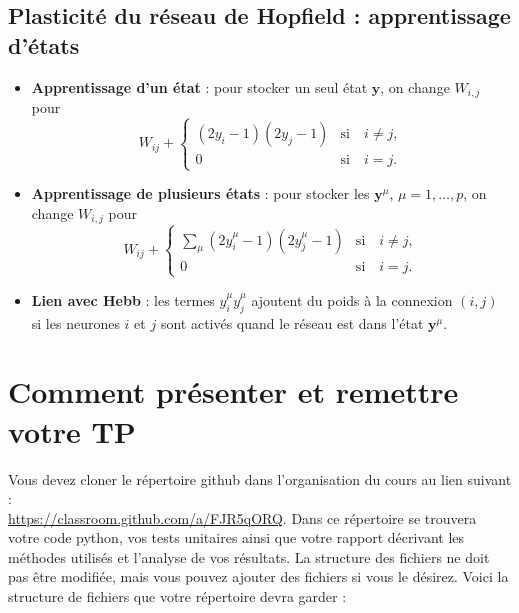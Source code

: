 \documentclass[12pt, letterpaper]{article}
\numberwithin{table}{section}
\numberwithin{figure}{section}
\numberwithin{equation}{section}
\begin{document}
\subsection{Plasticité du réseau de Hopfield : apprentissage d'états}
\begin{itemize}[label=\textbullet]
    \item \textbf{Apprentissage d'un état} : pour stocker un seul état $\mathbf{y}$, on change $W_{i,j}$ pour
    \[
    W_{ij} +
    \begin{cases}
    (2y_i - 1)(2y_j - 1)&  \text{si} \quad i \neq j, \\
    0 &  \text{si} \quad i= j.
    \end{cases}
    \]
    \item \textbf{Apprentissage de plusieurs états} : pour stocker les $\mathbf{y}^\mu$, $\mu=1,\ldots, p$,  on change $W_{i,j}$ pour
    \[
    W_{ij} +
    \begin{cases}
    \sum_{\mu}(2y^\mu_i - 1)(2y^\mu_j - 1)&  \text{si} \quad i \neq j, \\
    0 &  \text{si} \quad i= j.
    \end{cases}
    \]
    \item \textbf{Lien avec Hebb} : les termes $y^\mu_i y^\mu_j $ ajoutent du poids à la connexion $(i,j)$ si
    les neurones $i$ et $j$ sont activés quand le réseau est dans l'état $\mathbf{y}^\mu$.
\end{itemize}



\section{Comment présenter et remettre votre TP}\label{sec:comment-presenter-et-remettre-votre-tp}

\noindent Vous devez cloner le répertoire github dans l'organisation du cours au lien suivant :\\
\href{https://classroom.github.com/a/FJR5qORQ}{https://classroom.github.com/a/FJR5qORQ}.
Dans ce répertoire se trouvera votre code python, vos tests unitaires ainsi que votre rapport
décrivant les méthodes utilisés et l'analyse de vos résultats.
La structure des fichiers ne doit pas être modifiée, mais vous pouvez ajouter des fichiers si vous le désirez.
Voici la structure de fichiers que votre répertoire devra garder :

\bigskip
\end{document}
